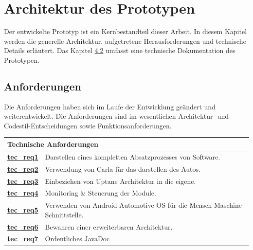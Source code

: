 \section{Architektur des Prototypen}
Der entwickelte Prototyp ist ein Kernbestandteil dieser Arbeit. In diesem Kapitel werden die generelle Architektur, aufgetretene Herausforderungen und technische Details erläutert. Das Kapitel \hyperref[architecture]{4.2} umfasst eine technische Dokumentation des Prototypen.
\subsection{Anforderungen}
Die Anforderungen haben sich im Laufe der Entwicklung geändert und weiterentwickelt. Die Anforderungen sind im wesentlichen Architektur- und Codestil-Entscheidungen sowie Funktionsanforderungen.\\

\begin{center}
	\begin{tabularx}{0.9\linewidth}{|c|X|}
		\hline
		\multicolumn{2}{|l|}{\textbf{Technische Anforderungen}}\\
		\hline
		
		\textbf{\hyperref[tecreq1]{tec\_req1}} & Darstellen eines kompletten Absatzprozesses von Software.\\
		\hline
		
		\textbf{\hyperref[tecreq2]{tec\_req2}} & Verwendung von Carla für das darstellen des Autos.\\
		\hline
		
		\textbf{\hyperref[tecreq3]{tec\_req3}} & Einbeziehen von Uptane Architektur in die eigene.\\
		\hline
		
		\textbf{\hyperref[tecreq4]{tec\_req4}} & Monitoring \& Steuerung der Module.\\
		\hline
		
		\textbf{\hyperref[tecreq5]{tec\_req5}} & Verwenden von Android Automotive OS für die Mensch Maschine Schnittstelle.\\
		\hline
		
		\textbf{\hyperref[tecreq6]{tec\_req6}} & Bewahren einer erweiterbaren Architektur.\\
		\hline
		
		\textbf{\hyperref[tecreq7]{tec\_req7}} & Ordentliches JavaDoc\\
		\hline
		
	\end{tabularx}
\end{center}

